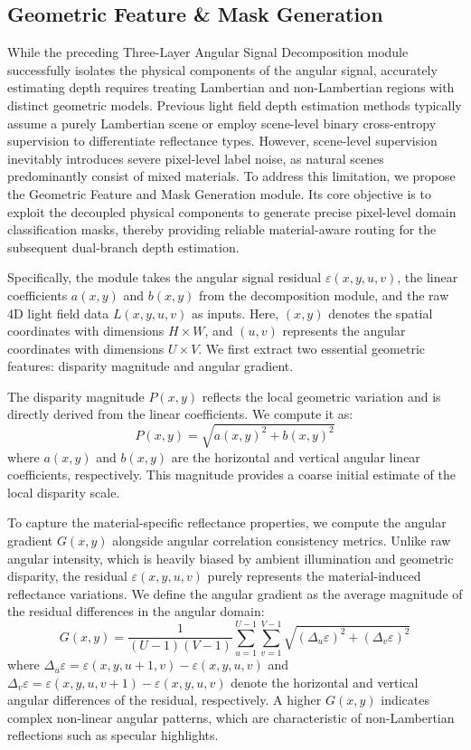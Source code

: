 \documentclass[lettersize,journal]{IEEEtran}
\begin{document}
\subsection{Geometric Feature \& Mask Generation}

While the preceding Three-Layer Angular Signal Decomposition module successfully isolates the physical components of the angular signal, accurately estimating depth requires treating Lambertian and non-Lambertian regions with distinct geometric models. Previous light field depth estimation methods typically assume a purely Lambertian scene or employ scene-level binary cross-entropy supervision to differentiate reflectance types. However, scene-level supervision inevitably introduces severe pixel-level label noise, as natural scenes predominantly consist of mixed materials. To address this limitation, we propose the Geometric Feature and Mask Generation module. Its core objective is to exploit the decoupled physical components to generate precise pixel-level domain classification masks, thereby providing reliable material-aware routing for the subsequent dual-branch depth estimation.

Specifically, the module takes the angular signal residual $\varepsilon(x,y,u,v)$, the linear coefficients $a(x,y)$ and $b(x,y)$ from the decomposition module, and the raw 4D light field data $L(x,y,u,v)$ as inputs. Here, $(x,y)$ denotes the spatial coordinates with dimensions $H \times W$, and $(u,v)$ represents the angular coordinates with dimensions $U \times V$. We first extract two essential geometric features: disparity magnitude and angular gradient.

The disparity magnitude $P(x,y)$ reflects the local geometric variation and is directly derived from the linear coefficients. We compute it as:
\begin{equation} \label{eq:ch3_5}
P(x,y) = \sqrt{a(x,y)^2 + b(x,y)^2}
\end{equation}
where $a(x,y)$ and $b(x,y)$ are the horizontal and vertical angular linear coefficients, respectively. This magnitude provides a coarse initial estimate of the local disparity scale.

To capture the material-specific reflectance properties, we compute the angular gradient $G(x,y)$ alongside angular correlation consistency metrics. Unlike raw angular intensity, which is heavily biased by ambient illumination and geometric disparity, the residual $\varepsilon(x,y,u,v)$ purely represents the material-induced reflectance variations. We define the angular gradient as the average magnitude of the residual differences in the angular domain:
\begin{equation} \label{eq:ch3_6}
G(x,y) = \frac{1}{(U-1)(V-1)} \sum_{u=1}^{U-1} \sum_{v=1}^{V-1} \sqrt{(\Delta_u \varepsilon)^2 + (\Delta_v \varepsilon)^2}
\end{equation}
where $\Delta_u \varepsilon = \varepsilon(x,y,u+1,v) - \varepsilon(x,y,u,v)$ and $\Delta_v \varepsilon = \varepsilon(x,y,u,v+1) - \varepsilon(x,y,u,v)$ denote the horizontal and vertical angular differences of the residual, respectively. A higher $G(x,y)$ indicates complex non-linear angular patterns, which are characteristic of non-Lambertian reflections such as specular highlights.
\end{document}
